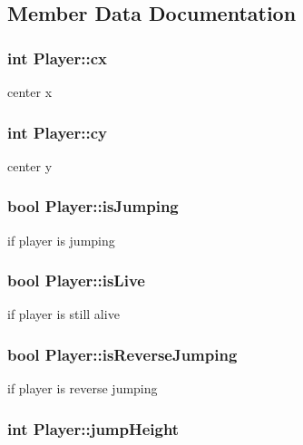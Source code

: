 \subsection{Member Data Documentation}
\hypertarget{struct_player_a10d006b3daa2e354476367ad931a2ac6}{
\subsubsection[{cx}]{\setlength{\rightskip}{0pt plus 5cm}int Player\-::cx}}\label{struct_player_a10d006b3daa2e354476367ad931a2ac6}
center x \hypertarget{struct_player_a61b687b371ad4b81827fd245b7e8f880}{
\subsubsection[{cy}]{\setlength{\rightskip}{0pt plus 5cm}int Player\-::cy}}\label{struct_player_a61b687b371ad4b81827fd245b7e8f880}
center y \hypertarget{struct_player_aab294bec9f8fed91bb7d599e37bfd5f6}{
\subsubsection[{is\-Jumping}]{\setlength{\rightskip}{0pt plus 5cm}bool Player\-::is\-Jumping}}\label{struct_player_aab294bec9f8fed91bb7d599e37bfd5f6}
if player is jumping \hypertarget{struct_player_ac37a8c409c969d9aa117c3ee25b8d523}{
\subsubsection[{is\-Live}]{\setlength{\rightskip}{0pt plus 5cm}bool Player\-::is\-Live}}\label{struct_player_ac37a8c409c969d9aa117c3ee25b8d523}
if player is still alive \hypertarget{struct_player_a71ca9f31cb654498da378f6db32b9eeb}{
\subsubsection[{is\-Reverse\-Jumping}]{\setlength{\rightskip}{0pt plus 5cm}bool Player\-::is\-Reverse\-Jumping}}\label{struct_player_a71ca9f31cb654498da378f6db32b9eeb}
if player is reverse jumping \hypertarget{struct_player_a23ee12d10a659932ebf917d1321ce49a}{
\subsubsection[{jump\-Height}]{\setlength{\rightskip}{0pt plus 5cm}int Player\-::jump\-Height}}\label{struct_player_a23ee12d10a659932ebf917d1321ce49a}
